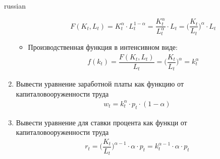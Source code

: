 \documentclass[fleqn]{article}
\begin{document}
\begin{otherlanguage*}{russian}
\begin{enumerate}[label=\alph*), leftmargin=*]
\begin{itemize}
$$ F(K_t, L_t) =  K^\alpha_t \cdot L_t^{1 - \alpha} = \frac{K^{\alpha}_t}{L_t^\alpha} \cdot L_t = \Big( \dfrac{K_t}{L_t} \Big) ^\alpha \cdot L_t $$ 

\item Производственная функция в интенсивном виде: 
\begin{align*}
f(k_t) = \dfrac{F(K_t, L_t)}{L_t} = \Big( \dfrac{K_t}{L_t} \Big)^ \alpha = k_t^ \alpha
\end{align*}
\end{itemize}
\item Вывести уравнение заработной платы как функцию от капиталовооруженности труда 
\begin{align*}
w_t = k^\alpha_t \cdot p_t \cdot (1 - \alpha) 
\end{align*}
\item Вывести уравнение для ставки процента как функци от капиталовооруженности труда 
\begin{align*}
r_t = \Big(\dfrac{K_t}{L_t} \Big)^{\alpha - 1} \cdot \alpha \cdot p_t = k^{\alpha - 1}_t \cdot \alpha \cdot p_t 
\end{align*}
\end{enumerate}

\end{otherlanguage*}
\end{document}
